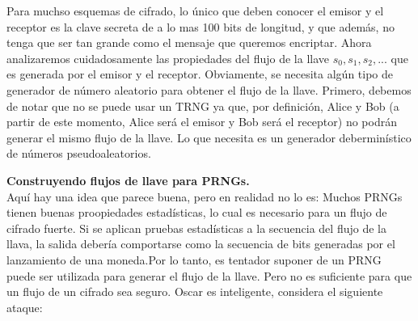 \documentclass{llncs}
\theoremstyle{plane}
\begin{document}
Para muchso esquemas de cifrado, lo único que deben conocer el emisor y el receptor es la clave secreta de a lo mas 100 bits de longitud, y que además, no tenga que ser tan grande como el mensaje que queremos encriptar. Ahora analizaremos cuidadosamente las propiedades del flujo de la llave $s_{0}, s_{1}, s_{2},...$ que es generada por el emisor y el receptor. Obviamente, se necesita algún tipo de generador de número aleatorio para obtener el flujo de la llave. Primero, debemos de notar que no se puede usar un TRNG ya que, por definición, Alice y Bob (a partir de este momento, Alice será el emisor y Bob será el receptor) no podrán generar el mismo flujo de la llave. Lo que necesita es un generador deberminístico de números pseudoaleatorios.

\textbf{Construyendo flujos de llave para PRNGs.} \\
Aquí hay una idea que parece buena, pero en realidad no lo es: Muchos PRNGs tienen buenas proopiedades estadísticas, lo cual es necesario para un flujo de cifrado fuerte. Si se aplican pruebas estadísticas a la secuencia del flujo de la llava, la salida debería comportarse como la secuencia de bits generadas por el lanzamiento de una moneda.Por lo tanto, es tentador suponer de un PRNG puede ser utilizada para generar el flujo de la llave. Pero no es suficiente para que un flujo de un cifrado sea seguro. Oscar es inteligente, considera el siguiente ataque:
\end{document}
